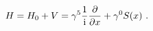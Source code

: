 \begin{equation}
H=H_0+V =\gamma^5 \frac{1}{\rm i} \frac{\partial}{\partial x} + \gamma^0 S(x)\ .
\label{d1}
\end{equation}

